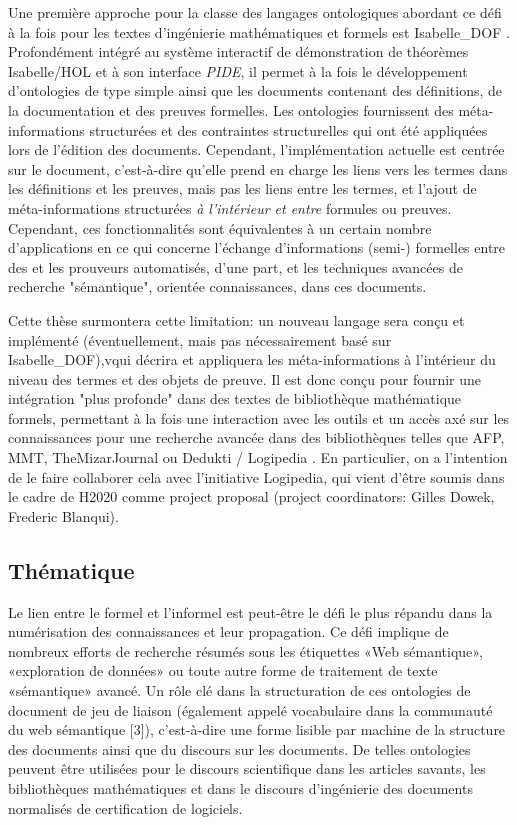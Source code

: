 \documentclass[a4paper,10pt]{article}
\begin{document}
Une première approche pour la classe des langages ontologiques abordant ce défi à la fois pour les textes d'ingénierie mathématiques et formels 
est Isabelle\_DOF \cite{Brucker-ea.Using-CICM18, BruckerWolff.Design-SEFM19, BruckerWolff.Certif-IFM19}. Profondément intégré au système interactif de démonstration de théorèmes Isabelle/HOL et à son interface \emph{PIDE}, il permet à la fois le développement d'ontologies de type simple ainsi que les documents contenant des définitions, de la documentation et des preuves formelles. Les ontologies fournissent des méta-informations structurées et des contraintes structurelles qui ont été appliquées lors de l'édition des documents. Cependant, l'implémentation actuelle est centrée sur le document, c'est-à-dire qu'elle prend en charge les liens vers les termes dans les définitions
et les preuves, mais pas les liens entre les termes, et l'ajout de méta-informations structurées \emph{à l'intérieur et entre} formules ou preuves. Cependant, ces fonctionnalités sont équivalentes à un certain nombre d'applications en ce qui concerne l'échange d'informations (semi-) formelles entre des et les prouveurs automatisés, d'une part, et les techniques avancées de recherche "sémantique", orientée connaissances, dans ces documents.

Cette thèse surmontera cette limitation: un nouveau langage sera conçu et implémenté (éventuellement, mais pas nécessairement basé sur 
Isabelle\_DOF),vqui décrira et appliquera les méta-informations à l'intérieur du niveau des termes et des objets de preuve. Il est donc conçu pour fournir une intégration "plus profonde" dans des textes de bibliothèque mathématique formels, permettant à la fois une interaction avec les outils et un accès axé sur les connaissances pour une recherche avancée dans des bibliothèques telles que AFP, MMT, TheMizarJournal ou Dedukti / Logipedia 
\cite {afp,mmt,TheMizarJournal,dedukti}. En particulier, on a l'intention de le faire collaborer cela avec l'initiative Logipedia, qui vient d'être 
soumis dans le cadre de H2020 comme project proposal (project coordinators: Gilles Dowek, Frederic Blanqui).

\subsection*{Thématique}
Le lien entre le formel et l'informel est peut-être le défi le plus répandu dans la numérisation des connaissances et leur propagation. Ce défi implique de nombreux efforts de recherche résumés sous les étiquettes «Web sémantique», «exploration de données» ou toute autre forme de traitement de texte «sémantique» avancé. Un rôle clé dans la structuration de ces ontologies de document de jeu de liaison (également appelé vocabulaire dans la communauté du web sémantique [3]), c'est-à-dire une forme lisible par machine de la structure des documents ainsi que du discours sur les documents. De telles ontologies peuvent être utilisées pour le discours scientifique dans les articles savants, les bibliothèques mathématiques et dans le discours d'ingénierie des documents normalisés de certification de logiciels.
\end{document}
